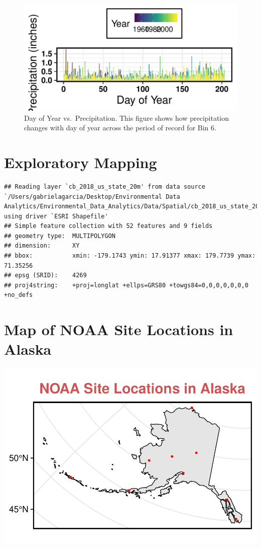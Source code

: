 \documentclass[12pt,]{article}
\begin{document}
\begin{figure}
\centering
\includegraphics{Project_Report_v2_files/figure-latex/unnamed-chunk-3-1.pdf}
\caption{Day of Year vs.~Precipitation. This figure shows how
precipitation changes with day of year across the period of record for
Bin 6.}
\end{figure}

\hypertarget{exploratory-mapping}{%
\section{Exploratory Mapping}\label{exploratory-mapping}}

\begin{verbatim}
## Reading layer `cb_2018_us_state_20m' from data source `/Users/gabrielagarcia/Desktop/Environmental Data Analytics/Environmental_Data_Analytics/Data/Spatial/cb_2018_us_state_20m.shp' using driver `ESRI Shapefile'
## Simple feature collection with 52 features and 9 fields
## geometry type:  MULTIPOLYGON
## dimension:      XY
## bbox:           xmin: -179.1743 ymin: 17.91377 xmax: 179.7739 ymax: 71.35256
## epsg (SRID):    4269
## proj4string:    +proj=longlat +ellps=GRS80 +towgs84=0,0,0,0,0,0,0 +no_defs
\end{verbatim}

\hypertarget{map-of-noaa-site-locations-in-alaska}{%
\section{Map of NOAA Site Locations in
Alaska}\label{map-of-noaa-site-locations-in-alaska}}

\includegraphics{Project_Report_v2_files/figure-latex/NOAA Site Locations across Alaska-1.pdf}
\end{document}
